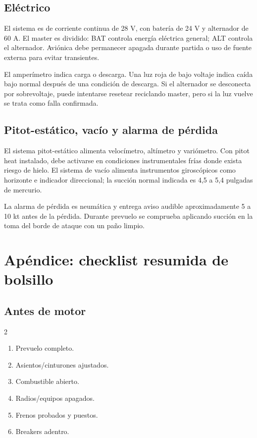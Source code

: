 \documentclass[11pt,oneside]{book}
\newenvironment{checklist}{\begin{enumerate}[label=\arabic*.]}{\end{enumerate}}
\begin{document}
\section{Eléctrico}

El sistema es de corriente continua de 28 V, con batería de 24 V y alternador de 60 A. El master es dividido: BAT controla energía eléctrica general; ALT controla el alternador. Aviónica debe permanecer apagada durante partida o uso de fuente externa para evitar transientes.

El amperímetro indica carga o descarga. Una luz roja de bajo voltaje indica caída bajo normal después de una condición de descarga. Si el alternador se desconecta por sobrevoltaje, puede intentarse resetear reciclando master, pero si la luz vuelve se trata como falla confirmada.

\section{Pitot-estático, vacío y alarma de pérdida}

El sistema pitot-estático alimenta velocímetro, altímetro y variómetro. Con pitot heat instalado, debe activarse en condiciones instrumentales frías donde exista riesgo de hielo. El sistema de vacío alimenta instrumentos giroscópicos como horizonte e indicador direccional; la succión normal indicada es 4,5 a 5,4 pulgadas de mercurio.

La alarma de pérdida es neumática y entrega aviso audible aproximadamente 5 a 10 kt antes de la pérdida. Durante prevuelo se comprueba aplicando succión en la toma del borde de ataque con un paño limpio.

\chapter{Apéndice: checklist resumida de bolsillo}

\section*{Antes de motor}
\begin{multicols}{2}
\begin{checklist}
\item Prevuelo completo.
\item Asientos/cinturones ajustados.
\item Combustible abierto.
\item Radios/equipos apagados.
\item Frenos probados y puestos.
\item Breakers adentro.
\end{checklist}
\end{multicols}
\end{document}
